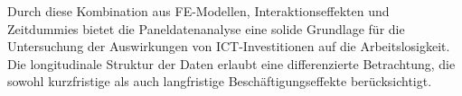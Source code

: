 Durch diese Kombination aus \ac{FE}-Modellen, Interaktionseffekten und Zeitdummies bietet die 
Paneldatenanalyse eine solide Grundlage für die Untersuchung der Auswirkungen von 
\ac{ICT}-Investitionen auf die Arbeitslosigkeit. Die longitudinale Struktur der Daten erlaubt eine 
differenzierte Betrachtung, die sowohl kurzfristige als auch langfristige Beschäftigungseffekte 
berücksichtigt.
